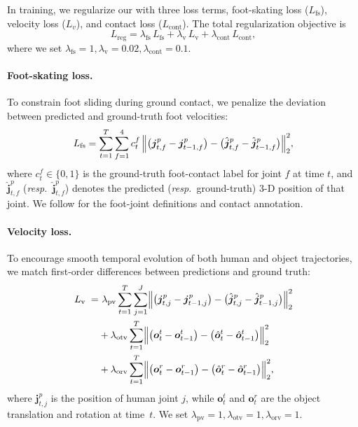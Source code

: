 In training, we regularize our \ours with three loss terms, foot-skating loss ($L_{\text{fs}}$), velocity loss ($L_v$), and contact loss ($L_{\text{cont}}$).  
The total regularization objective is
\begin{equation}
  L_{\text{reg}}
  = \lambda_{\text{fs}}\,L_{\text{fs}}
  + \lambda_{\text{v}}\,L_{\text{v}}
  + \lambda_{\text{cont}}\,L_{\text{cont}},
\end{equation}
where we set $\lambda_{\text{fs}}=1, \lambda_{\text{v}}=0.02, \lambda_{\text{cont}}=0.1.$

\paragraph{Foot-skating loss.}
To constrain foot sliding during ground contact, we penalize the deviation between predicted and ground-truth foot velocities:
\begin{equation}
  L_{\text{fs}}
  = \sum_{t=1}^{T}\sum_{f=1}^{4}
      {c}^{f}_{t}\,
      \Bigl\|
        \bigl(\boldsymbol{j}^{p}_{t,f}-\boldsymbol{j}^{p}_{t-1,f}\bigr)
        -
        \bigl(\hat{\boldsymbol{j}}^{p}_{t,f}-\hat{\boldsymbol{j}}^{p}_{t-1,f}\bigr)
      \Bigr\|_2^{2},
\end{equation}
where ${c}^{f}_{t}\!\in\!\{0,1\}$ is the ground-truth foot-contact label for joint $f$ at time $t$, and $\hat{\boldsymbol{j}}^{p}_{t,f}$ (\emph{resp.}\ $\hat{\boldsymbol{j}}^{p}_{t,f}$) denotes the predicted (\emph{resp.}\ ground-truth) 3-D position of that joint. We follow \citep{guo2022generating} for the foot-joint definitions and contact annotation.

\paragraph{Velocity loss.}
To encourage smooth temporal evolution of both human and object trajectories, we match first-order differences between predictions and ground truth:
\begin{align}
  L_{\text{v}} \;=&~
    \lambda_{\text{pv}}
    \sum_{t=1}^{T}\sum_{j=1}^{J}
      \Bigl\|
        \bigl(\boldsymbol{j}^{p}_{t,j}-\boldsymbol{j}^{p}_{t-1,j}\bigr)
        -
        \bigl(\hat{\boldsymbol{j}}^{p}_{t,j}-\hat{\boldsymbol{j}}^{p}_{t-1,j}\bigr)
      \Bigr\|_2^{2}
      \nonumber\\
  &+
    \lambda_{\text{otv}}
    \sum_{t=1}^{T}
      \Bigl\|
        \bigl(\boldsymbol{o}^{t}_{t}-\boldsymbol{o}^{t}_{t-1}\bigr)
        -
        \bigl(\hat{\boldsymbol{o}}^{t}_{t}-\hat{\boldsymbol{o}}^{t}_{t-1}\bigr)
      \Bigr\|_2^{2}
      \nonumber\\
  &+
    \lambda_{\text{orv}}
    \sum_{t=1}^{T}
      \Bigl\|
        \bigl(\boldsymbol{o}^{r}_{t}-\boldsymbol{o}^{r}_{t-1}\bigr)
        -
        \bigl(\hat{\boldsymbol{o}}^{r}_{t}-\hat{\boldsymbol{o}}^{r}_{t-1}\bigr)
      \Bigr\|_2^{2},
\end{align}
where $\boldsymbol{j}^{p}_{t,j}$ is the position of human joint $j$, while $\boldsymbol{o}^{t}_{t}$ and $\boldsymbol{o}^{r}_{t}$ are the object translation and rotation at time~$t$.  
We set $\lambda_{\text{pv}} = 1, \lambda_{\text{otv}} =1, \lambda_{\text{orv}} =1.$

